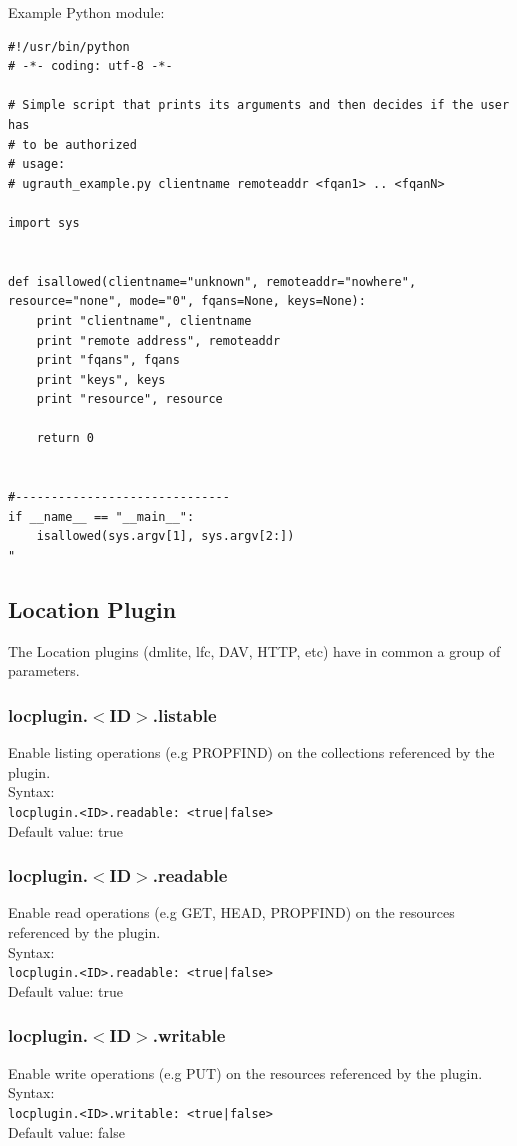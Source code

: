 \documentclass[12pt]{article} %
\begin{document}
Example Python module:\\

\begin{lstlisting}
#!/usr/bin/python
# -*- coding: utf-8 -*-

# Simple script that prints its arguments and then decides if the user has
# to be authorized
# usage:
# ugrauth_example.py clientname remoteaddr <fqan1> .. <fqanN>

import sys


def isallowed(clientname="unknown", remoteaddr="nowhere", resource="none", mode="0", fqans=None, keys=None):
    print "clientname", clientname
    print "remote address", remoteaddr
    print "fqans", fqans
    print "keys", keys
    print "resource", resource

    return 0


#------------------------------
if __name__ == "__main__":
    isallowed(sys.argv[1], sys.argv[2:])
"
\end{lstlisting}


\subsection{Location Plugin}
The Location plugins (dmlite, lfc, DAV, HTTP, etc) have in common a group of parameters.

\subsubsection{locplugin.$<$ID$>$.listable}
Enable listing operations (e.g PROPFIND) on the collections referenced by the plugin.\\
Syntax:\\
\lstinline"locplugin.<ID>.readable: <true|false>"\\
Default value: true\\

\subsubsection{locplugin.$<$ID$>$.readable}
Enable read operations (e.g GET, HEAD, PROPFIND) on the resources referenced by the plugin.\\
Syntax:\\
\lstinline"locplugin.<ID>.readable: <true|false>"\\
Default value: true\\

\subsubsection{locplugin.$<$ID$>$.writable}
Enable write operations (e.g PUT) on the resources referenced by the plugin.\\
Syntax:\\
\lstinline"locplugin.<ID>.writable: <true|false>"\\
Default value: false\\
\end{document}
